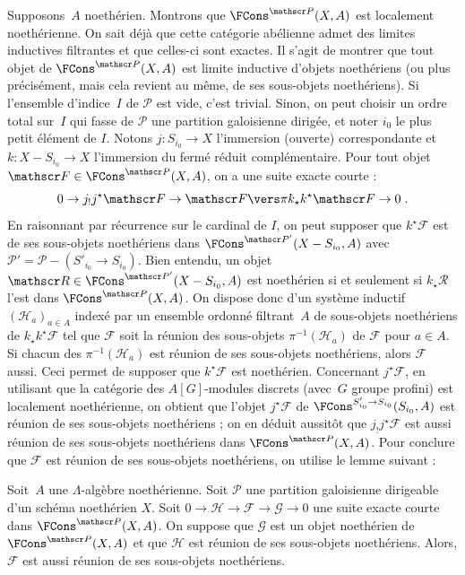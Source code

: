 \documentclass[10pt]{../fichiers-configuration-latex/smfart}
\begin{document}
Supposons $A$ noethérien.
Montrons que $\FCons^{\mathscr P}(X,A)$ est localement noethérienne. On sait
déjà que cette catégorie abélienne admet des limites inductives filtrantes
et que celles-ci sont exactes. Il s'agit de montrer que tout objet de
$\FCons^{\mathscr P}(X,A)$ est limite inductive d'objets noethériens (ou
plus précisément, mais cela revient au même,
 de ses sous-objets noethériens). Si
l'ensemble d'indice $I$ de $\mathscr P$ est vide, c'est trivial. Sinon, on
peut choisir un ordre total sur $I$ qui fasse de $\mathscr P$ une partition
galoisienne dirigée, et noter $i_0$ le plus petit élément de $I$. Notons
$j\colon S_{i_0}\to X$ l'immersion (ouverte) correspondante et $k\colon
X-S_{i_0}\to X$ l'immersion du fermé réduit complémentaire. Pour tout objet
$\mathscr F\in \FCons^{\mathscr P}(X,A)$, on a une suite exacte courte :
\[0\to j_!j^\star\mathscr F\to \mathscr F\vers\pi k_\star k^\star \mathscr F\to
0\;\text{.}\]
En raisonnant par récurrence sur
le cardinal de $I$, on peut supposer que $k^\star\mathscr F$ est
 de ses sous-objets noethériens dans $\FCons^{\mathscr
P'}(X-S_{i_0},A)$ avec $\mathscr P'=\mathscr P-(S'_{i_0}\to S_{i_0})$. Bien
entendu, un objet $\mathscr R\in \FCons^{\mathscr P'}(X-S_{i_0},A)$ est
noethérien si et seulement si $k_\star\mathscr R$ l'est dans
$\FCons^{\mathscr P}(X,A)$. On dispose
donc d'un système inductif $({\mathscr H}_a)_{a\in A}$ indexé par un ensemble
ordonné filtrant $A$ de sous-objets noethériens de $k_\star k^\star
\mathscr F$ tel que $\mathscr F$ soit la réunion des sous-objets
$\pi^{-1}(\mathscr H_a)$ de $\mathscr F$ pour $a\in A$.
Si chacun des $\pi^{-1}(\mathscr H_a)$ est réunion de ses sous-objets
noethériens, alors $\mathscr F$ aussi. Ceci permet de supposer que
$k^\star \mathscr F$ est noethérien. Concernant $j^\star\mathscr F$, en
utilisant que 
la catégorie des $A[G]$-modules discrets (avec $G$ groupe profini) est
localement noethérienne, on obtient que l'objet $j^\star\mathscr F$ de
$\FCons^{S'_{i_0}\to S_{i_0}}(S_{i_0},A)$ est réunion de ses sous-objets
noethériens ; on en déduit aussitôt que $j_!j^\star\mathscr F$ est aussi
réunion de ses sous-objets noethériens dans $\FCons^{\mathscr P}(X,A)$. Pour
conclure que $\mathscr F$ est réunion de ses sous-objets noethériens, on
utilise le lemme suivant :

\begin{lemme2}
Soit $A$ une $\Lambda$-algèbre noethérienne.
Soit $\mathscr P$ une partition galoisienne dirigeable
d'un schéma noethérien $X$.
Soit $0\to \mathscr H\to\mathscr F\to \mathscr G\to 0$ une suite exacte
courte dans $\FCons^{\mathscr P}(X,A)$. On suppose que $\mathscr G$ est un
objet noethérien de $\FCons^{\mathscr P}(X,A)$ et que
$\mathscr H$ est réunion de ses sous-objets noethériens.
Alors, $\mathscr F$ est aussi réunion de ses sous-objets noethériens.
\end{lemme2}
\end{document}
